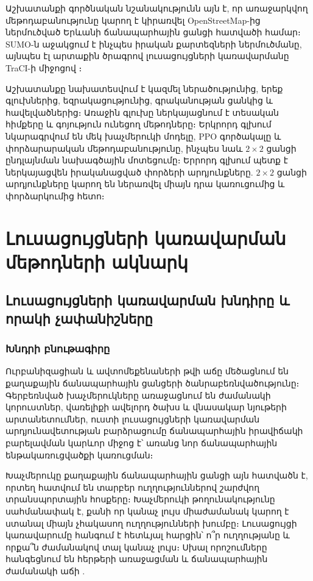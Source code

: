 \documentclass[12pt,a4paper]{extreport}
\begin{document}
Աշխատանքի գործնական նշանակությունն այն է, որ առաջարկվող մեթոդաբանությունը կարող է կիրառվել OpenStreetMap-ից ներմուծված Երևանի ճանապարհային ցանցի հատվածի համար։ SUMO-ն աջակցում է ինչպես իրական քարտեզների ներմուծմանը, այնպես էլ արտաքին ծրագրով լուսացույցների կառավարմանը TraCI-ի միջոցով \cite{sumoDocs,traciDocs}։

Աշխատանքը նախատեսվում է կազմել ներածությունից, երեք գլուխներից, եզրակացությունից, գրականության ցանկից և հավելվածներից։ Առաջին գլուխը ներկայացնում է տեսական հիմքերը և գոյություն ունեցող մեթոդները։ Երկրորդ գլխում նկարագրվում են մեկ խաչմերուկի մոդելը, PPO գործակալը և փորձարարական մեթոդաբանությունը, ինչպես նաև $2\times2$ ցանցի ընդլայնման նախագծային մոտեցումը։ Երրորդ գլխում պետք է ներկայացվեն իրականացված փորձերի արդյունքները. $2\times2$ ցանցի արդյունքները կարող են ներառվել միայն դրա կառուցումից և փորձարկումից հետո։

\chapter{Լուսացույցների կառավարման մեթոդների ակնարկ}

\section{Լուսացույցների կառավարման խնդիրը և որակի չափանիշները}

\subsection{Խնդրի բնութագիրը}

Ուրբանիզացիան և ավտոմեքենաների թվի աճը մեծացնում են քաղաքային ճանապարհային ցանցերի ծանրաբեռնվածությունը։ Գերբեռնված խաչմերուկները առաջացնում են ժամանակի կորուստներ, վառելիքի ավելորդ ծախս և վնասակար նյութերի արտանետումներ, ուստի լուսացույցների կառավարման արդյունավետության բարձրացումը ճանապարհային իրավիճակի բարելավման կարևոր միջոց է՝ առանց նոր ճանապարհային ենթակառուցվածքի կառուցման։

Խաչմերուկը քաղաքային ճանապարհային ցանցի այն հատվածն է, որտեղ հատվում են տարբեր ուղղություններով շարժվող տրանսպորտային հոսքերը։ Խաչմերուկի թողունակությունը սահմանափակ է, քանի որ կանաչ լույս միաժամանակ կարող է ստանալ միայն չհակասող ուղղությունների խումբը։ Լուսացույցի կառավարումը հանգում է հետևյալ հարցին՝ ո՞ր ուղղությանը և որքա՞ն ժամանակով տալ կանաչ լույս։ Սխալ որոշումները հանգեցնում են հերթերի առաջացման և ճանապարհային ժամանակի աճի \cite{webster1958}.
\end{document}
